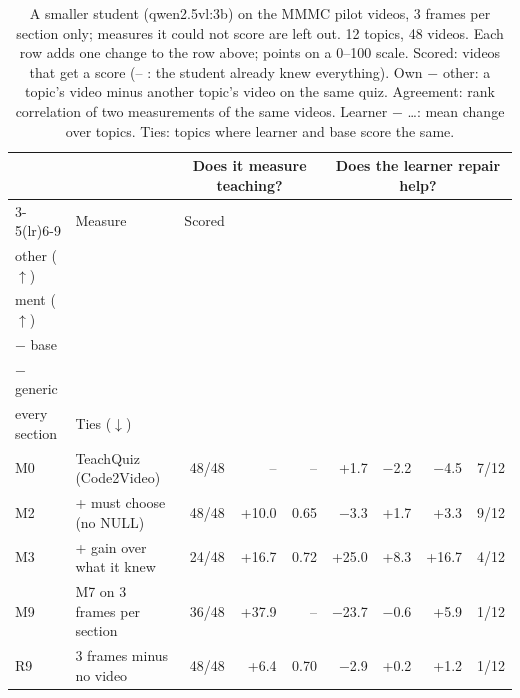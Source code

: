 \begin{table}[t]\centering\footnotesize
\caption{A smaller student (qwen2.5vl:3b) on the MMMC pilot videos, 3 frames per section only; measures it could not score are left out. 12 topics, 48 videos. Each row adds one change to the row above; points on a 0--100 scale. Scored: videos that get a score (-- : the student already knew everything). Own $-$ other: a topic's video minus another topic's video on the same quiz. Agreement: rank correlation of two measurements of the same videos. Learner $-$ \ldots: mean change over topics. Ties: topics where learner and base score the same.}\label{tab:ladder_small}
\setlength{\tabcolsep}{4pt}\begin{tabular}{@{}llrrrrrrr@{}}\toprule & & \multicolumn{3}{c}{Does it measure teaching?} & \multicolumn{4}{c}{Does the learner repair help?}\\
\cmidrule(lr){3-5}\cmidrule(lr){6-9}
& Measure & Scored & \hd{Own $-$\\other ($\uparrow$)} & \hd{Agree-\\ment ($\uparrow$)} & \hd{Learner\\$-$ base} & \hd{Learner\\$-$ generic} & \hd{Learner $-$\\every section} & Ties ($\downarrow$)\\\midrule
M0 & TeachQuiz (Code2Video) & 48/48 & -- & -- & +1.7 & $-$2.2 & $-$4.5 & 7/12 \\
M2 & + must choose (no NULL) & 48/48 & +10.0 & 0.65 & $-$3.3 & +1.7 & +3.3 & 9/12 \\
M3 & + gain over what it knew & 24/48 & +16.7 & 0.72 & +25.0 & +8.3 & +16.7 & 4/12 \\
M9 & M7 on 3 frames per section & 36/48 & +37.9 & -- & $-$23.7 & $-$0.6 & +5.9 & 1/12 \\
R9 & 3 frames minus no video & 48/48 & +6.4 & 0.70 & $-$2.9 & +0.2 & +1.2 & 1/12 \\
\bottomrule\end{tabular}
\end{table}

